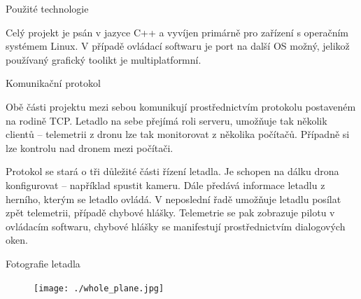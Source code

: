 \documentclass[final]{beamer}
\newlength{\colwidth}
\begin{document}
\begin{frame}[t]
\begin{columns}[t]
\begin{column}{\colwidth}
\begin{block}{Použité technologie}
\begin{figure}
          \hfill
          \hfill

        \end{figure}

			Celý projekt je psán v jazyce C++ a vyvíjen primárně pro zařízení s operačním systémem Linux.
			V případě ovládací softwaru je port na další OS možný, jelikož používaný grafický toolikt je multiplatformní.



      \end{block}

      \begin{block}{Komunikační protokol}

				Obě části projektu mezi sebou komunikují prostřednictvím protokolu postaveném na rodině TCP.
				Letadlo na sebe přejímá roli serveru, umožňuje tak několik clientů -- telemetrii z dronu lze tak monitorovat z několika počítačů.
				Případně si lze  kontrolu nad dronem mezi počítači.

				Protokol se stará o tři důležité části řízení letadla.
				Je schopen na dálku drona konfigurovat -- například spustit kameru.
				Dále předává informace letadlu z herního, kterým se letadlo ovládá.
				V neposlední řadě umožňuje letadlu posílat zpět telemetrii, případě chybové hlášky.
				Telemetrie se pak zobrazuje pilotu v ovládacím softwaru, chybové hlášky se manifestují prostřednictvím dialogových oken.
      \end{block}

      \begin{block}{Fotografie letadla}


				\begin{figure}[h]
					\centering
					\texttt{[image: ./whole\_plane.jpg]}
				\end{figure}

      \end{block}


\end{column}
\end{columns}
\end{frame}
\end{document}
